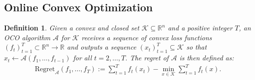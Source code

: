 \documentclass[a4paper,12pt]{article}
\newtheorem{definition} {Definition}
\newcommand{\mA}{\mathcal{A}}
\newcommand{\mK}{\mathcal{K}}
\newcommand{\reals}{\mathbb{R}}
\begin{document}
\subsection{Online Convex Optimization}
\begin{definition}\label{dif:regret}
Given a convex and closed set $\mK\subseteq\reals^n$ and a positive integer $T$, an OCO algorithm $\mA$ for $\mK$ receives a sequence of convex loss functions $(f_t)_{t=1}^T\subset{}\reals^n\rightarrow\reals$ and outputs a sequence $(x_t)_{t=1}^T\subseteq\mK$ so that $x_{t} \gets \mA(f_1,\dots,f_{t-1})$ for all  $t =2, \dots ,T$. The regret of $\mA$ is then defined as:
\begin{align*}
\text{Regret}_{\mA}(f_1,\dots,f_T) :=\sum_{t=1}^T f_t(x_t) - \min_{x \in \mK} \sum_{t=1}^Tf_t(x).
\end{align*}
\end{definition}
\end{document}
